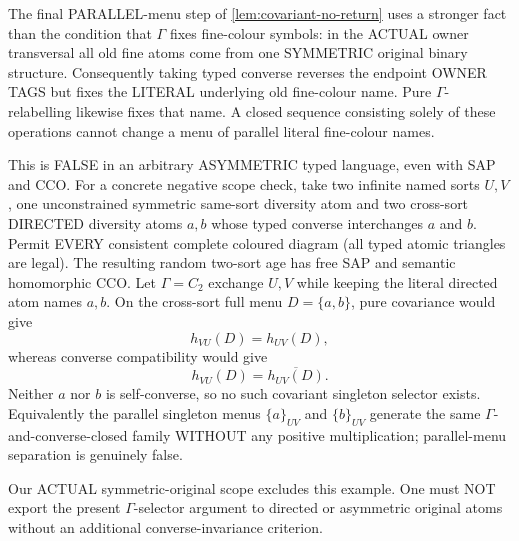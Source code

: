 \begin{remark}
\label{rem:covariant-converse-symmetry-firewall}
The final PARALLEL-menu step of
\cref{lem:covariant-no-return}
uses a stronger fact than
the condition that $\Gamma$
fixes fine-colour symbols:
in the ACTUAL owner transversal
all old fine atoms come from one
SYMMETRIC original binary structure.
Consequently taking typed converse
reverses the endpoint OWNER TAGS
but fixes the LITERAL underlying
old fine-colour name. Pure
$\Gamma$-relabelling likewise
fixes that name. A closed
sequence consisting solely of
these operations cannot change
a menu of parallel literal
fine-colour names.

This is FALSE in an arbitrary
ASYMMETRIC typed language,
even with SAP and CCO.
For a concrete negative
scope check, take two infinite
named sorts $U,V$, one
unconstrained symmetric
same-sort diversity atom
and two cross-sort DIRECTED
diversity atoms $a,b$ whose
typed converse interchanges
$a$ and $b$. Permit EVERY
consistent complete coloured
diagram (all typed atomic
triangles are legal).
The resulting random two-sort
age has free SAP and semantic
homomorphic CCO. Let
$\Gamma=C_2$ exchange $U,V$
while keeping the literal
directed atom names $a,b$.
On the cross-sort full menu
$D=\{a,b\}$, pure covariance
would give
\[
       h_{VU}(D)=h_{UV}(D),
\]
whereas converse compatibility
would give
\[
       h_{VU}(D)=\overline{h_{UV}(D)}.
\]
Neither $a$ nor $b$ is
self-converse, so no such
covariant singleton selector
exists. Equivalently the
parallel singleton menus
$\{a\}_{UV}$ and $\{b\}_{UV}$
generate the same
$\Gamma$-and-converse-closed
family WITHOUT any positive
multiplication; parallel-menu
separation is genuinely false.

Our ACTUAL symmetric-original
scope excludes this example.
One must NOT export the
present $\Gamma$-selector
argument to directed or
asymmetric original atoms
without an additional
converse-invariance criterion.
\end{remark}


